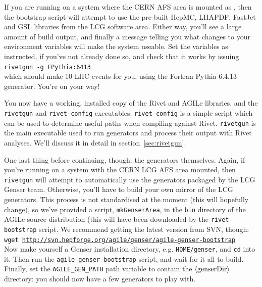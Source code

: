 \documentclass{JHEP3}
\newcommand{\kbd}[1]{\texttt{#1}\xspace}
\newcommand{\inp}[1]{\textsf{\textdollar}\hspace{1mm}\texttt{#1}\xspace}
\newcommand{\var}[1]{\texttt{\textdollar{}#1}\xspace}
\newcommand{\val}[1]{\textit{\ensuremath{\langle\text{\textrm{#1}\/}\rangle}}\xspace}
\newcommand{\SectionRef}[1]{section~\ref{#1}}
\begin{document}
If you are running on a system where the CERN AFS area is mounted as
, then the bootstrap script will attempt to use the pre-built
HepMC, LHAPDF, FastJet and GSL libraries from the LCG software area. Either way,
you'll see a large amount of build output, and finally a message telling you
what changes to your environment variables will make the system useable. Set the
variables as instructed, if you've not already done so, and check that it works
by issuing\\
\inp{rivetgun -g FPythia:6413}\\
which should make 10 LHC events for you, using the Fortran Pythia 6.4.13
generator. You're on your way!

You now have a working, installed copy of the Rivet and AGILe libraries, and the
\kbd{rivetgun} and \kbd{rivet-config} executables. \kbd{rivet-config} is a
simple script which can be used to determine useful paths when compiling against
Rivet. \kbd{rivetgun} is the main executable used to run generators and process
their output with Rivet analyses. We'll discuss it in detail
in \SectionRef{sec:rivetgun}.

One last thing before continuing, though: the generators themselves. Again, if
you're running on a system with the CERN LCG AFS area mounted, then
\kbd{rivetgun} will attempt to automatically use the generators packaged by the
LCG Genser team. Otherwise, you'll have to build your own mirror of the LCG
generators. This process is not standardised at the moment (this will hopefully
change), so we've provided a script, \kbd{mkGenserArea}, in the \kbd{bin}
directory of the AGILe source distribution (this will have been downloaded by
the \kbd{rivet-bootstrap} script. We recommend getting the latest version from
SVN, though:\\
\inp{wget \url{http://svn.hepforge.org/agile/genser/agile-genser-bootstrap}}\\
Now make yourself a Genser installation directory, e.g. \kbd{\var{HOME}/genser},
and \kbd{cd} into it. Then run the \kbd{agile-genser-bootstrap} script, and wait
for it all to build. Finally, set the \var{AGILE_GEN_PATH} path variable to
contain the \kbd{\val{genserDir}} directory: you should now have a few
generators to play with.
\end{document}
